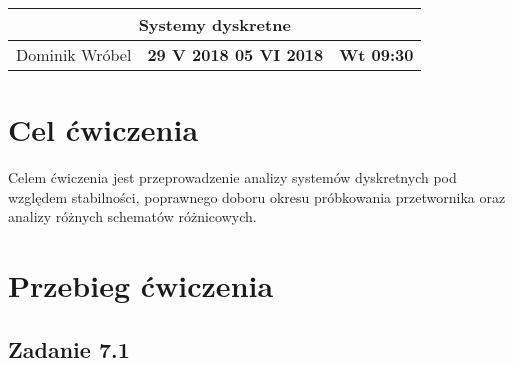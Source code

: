 \documentclass[a4paper,11pt]{article}
\begin{document}
\begin{table}
\begin{center}
\begin{tabular}{|l|p{1.8cm}|l|}
\hline
\multicolumn{3}{|c|}{\textbf{Systemy dyskretne}} \\ 
\hline 
Dominik Wróbel &  \textbf{29 V 2018 05 VI 2018 }  & \textbf{Wt 09:30} \\ 
\hline

\end{tabular}
\end{center}
\end{table}
\tableofcontents
\section{Cel ćwiczenia}
Celem ćwiczenia jest przeprowadzenie analizy systemów dyskretnych pod względem stabilności, poprawnego doboru okresu próbkowania przetwornika oraz analizy różnych schematów różnicowych.
\section{Przebieg ćwiczenia}
\subsection{Zadanie 7.1}
\end{document}
